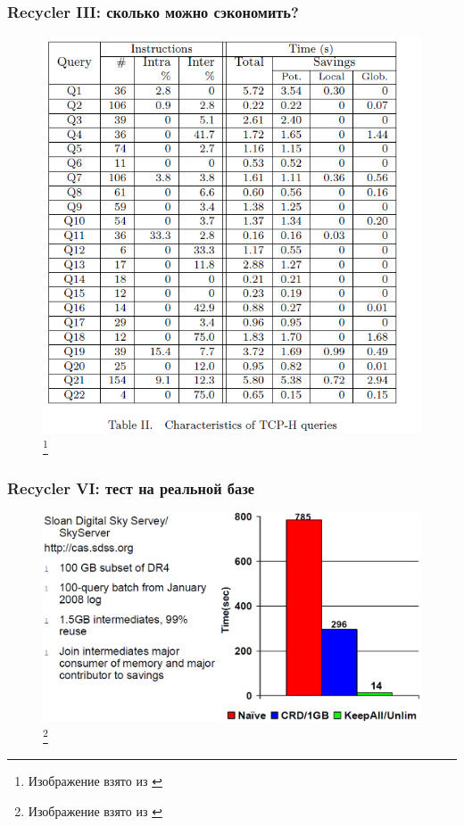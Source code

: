 \documentclass{beamer}
\begin{document}
\begin{frame}
\frametitle{Recycler III: сколько можно сэкономить?}

\begin{figure}[htb]
\includegraphics[width=\textwidth,height=0.750\textheight,keepaspectratio]{reccache.png} 
\footnote{\tiny{Изображение взято из \cite{Ivanova2010}}}
\end{figure}

\end{frame}

\begin{frame}
\frametitle{Recycler VI: тест на реальной базе}

\begin{figure}[htb]
\includegraphics[width=\textwidth,height=0.750\textheight,keepaspectratio]{recres.png} 
\footnote{\tiny{Изображение взято из \cite{Ivanova2010}}}
\end{figure}

\end{frame}
\end{document}
